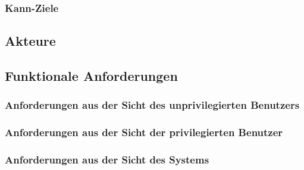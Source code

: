 \documentclass[12pt]{article}
\begin{document}
      \subsubsection{Kann-Ziele}

    \subsection{Akteure}

    \subsection{Funktionale Anforderungen}
      \subsubsection{Anforderungen aus der Sicht des unprivilegierten Benutzers}
      \subsubsection{Anforderungen aus der Sicht der privilegierten Benutzer}
      \subsubsection{Anforderungen aus der Sicht des Systems}
\end{document}
